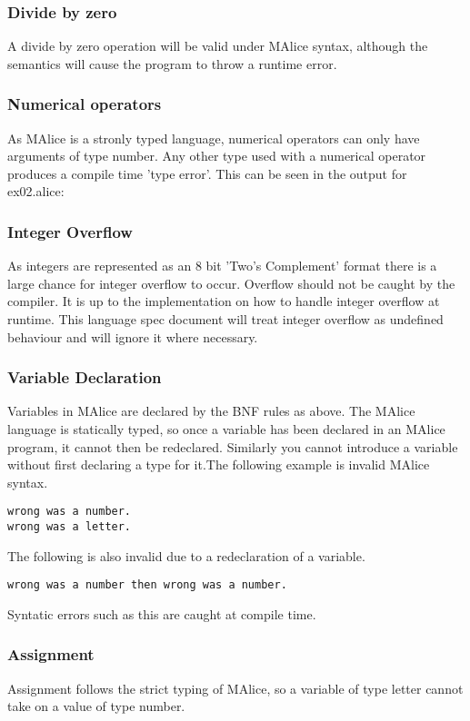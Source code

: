\documentclass[a4wide, 10pt]{article}
\newcommand{\tab}{\hspace*{2em}}
\begin{document}
\subsubsection{Divide by zero}
A divide by zero operation will be valid under MAlice syntax, although the
semantics will cause the program to throw a runtime error.


\subsubsection{Numerical operators}
As MAlice is a stronly typed language, numerical operators can only have 
arguments of type number. Any other type used with a numerical operator
produces a compile time 'type error'. This can be seen in the output for ex02.alice:


\subsubsection{Integer Overflow}
As integers are represented as an 8 bit 'Two's Complement' format there is 
a large chance for integer overflow to occur. Overflow should not be caught
by the compiler. It is up to the implementation on how to handle integer 
overflow at runtime. This language spec document will treat integer 
overflow as undefined behaviour and will ignore it where necessary.


\subsubsection{Variable Declaration}
Variables in MAlice are declared by the BNF rules as above. The MAlice 
language is statically typed, so once a variable has been declared in an
MAlice program, it cannot then be redeclared. Similarly you cannot introduce
a variable without first declaring a type for it.The following example is
invalid MAlice syntax.

\texttt{\tab wrong was a number.\\ \tab wrong was a letter.}

The following is also invalid due to a redeclaration of a variable.

\texttt{\tab wrong was a number then wrong was a number.} 

Syntatic errors such as this are caught at compile time.


\subsubsection{Assignment}
Assignment follows the strict typing of MAlice, so a variable of type letter 
cannot take on a value of type number.
\end{document}
